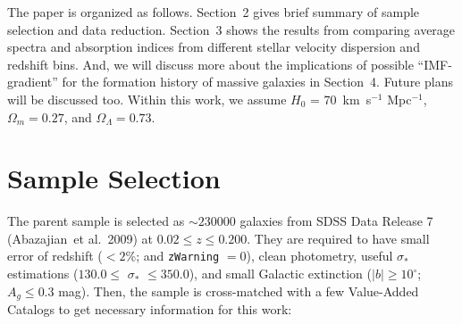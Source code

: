 \documentclass[preprint]{aastex}
\def\degree{{\circ}}
\def\etal{{\ et al.~}}
\newcommand\abs[1]{\left\lvert #1 \right\rvert}
\def\sigstar{$\sigma_{\ast}$}
\begin{document}
\begin{CJK*}{UTF8}{gbsn}
  The paper is organized as follows.  Section~2 gives brief summary of 
  sample selection and data reduction.  Section~3 shows the results from 
  comparing average spectra and absorption indices from different stellar 
  velocity dispersion and redshift bins.  And, we will discuss more 
  about the implications of possible ``IMF-gradient'' for the formation 
  history of massive galaxies in Section~4.  Future plans will be 
  discussed too.  Within this work, we assume $H_0$ = 70~km~s$^{-1}$ 
  Mpc$^{-1}$, ${\Omega}_m=0.27$, and ${\Omega}_{\Lambda}=0.73$.
  
\section{Sample Selection} 

  The parent sample is selected as $\sim 230000$ galaxies from SDSS Data 
  Release 7 (Abazajian\etal 2009) at $0.02 \le z \le 0.200$.  They are 
  required to have small error of redshift ($< 2$\%; and {\tt zWarning} 
  $=0$), clean photometry, useful \sigstar estimations ($130.0 \leq$ \sigstar
  $\le 350.0$), and small Galactic extinction ($\abs{b} \geq 10^{\degree}$; 
  $A_g \le 0.3$ mag).  Then, the sample is cross-matched with a few 
  Value-Added Catalogs to get necessary information for this work: 
  

\end{CJK*}
\end{document}
